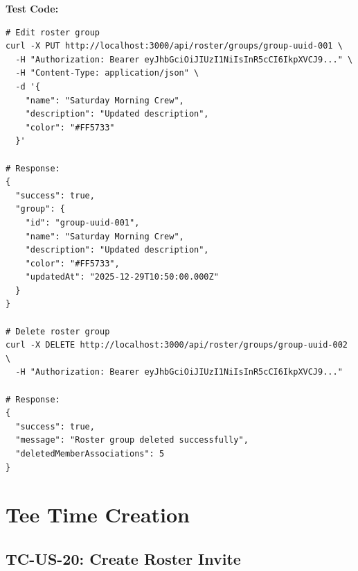 \documentclass[11pt,a4paper]{article}
\begin{document}
\vspace{0.3cm}
\textbf{Test Code:}
\begin{lstlisting}
# Edit roster group
curl -X PUT http://localhost:3000/api/roster/groups/group-uuid-001 \
  -H "Authorization: Bearer eyJhbGciOiJIUzI1NiIsInR5cCI6IkpXVCJ9..." \
  -H "Content-Type: application/json" \
  -d '{
    "name": "Saturday Morning Crew",
    "description": "Updated description",
    "color": "#FF5733"
  }'

# Response:
{
  "success": true,
  "group": {
    "id": "group-uuid-001",
    "name": "Saturday Morning Crew",
    "description": "Updated description",
    "color": "#FF5733",
    "updatedAt": "2025-12-29T10:50:00.000Z"
  }
}

# Delete roster group
curl -X DELETE http://localhost:3000/api/roster/groups/group-uuid-002 \
  -H "Authorization: Bearer eyJhbGciOiJIUzI1NiIsInR5cCI6IkpXVCJ9..."

# Response:
{
  "success": true,
  "message": "Roster group deleted successfully",
  "deletedMemberAssociations": 5
}
\end{lstlisting}

\newpage


\section{Tee Time Creation}

\subsection{TC-US-20: Create Roster Invite}
\end{document}
